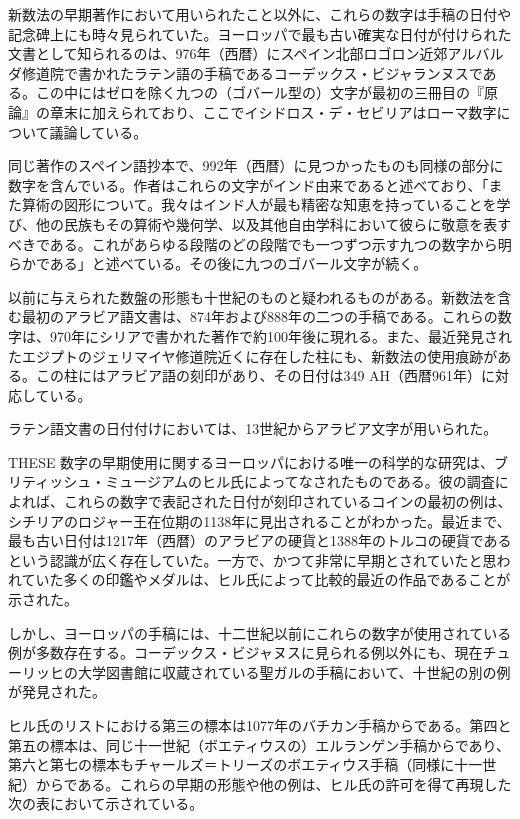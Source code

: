\documentclass[a4paper,11pt,openany]{ltjsbook}
\begin{document}
新数法の早期著作において用いられたこと以外に、これらの数字は手稿の日付や記念碑上にも時々見られていた。ヨーロッパで最も古い確実な日付が付けられた文書として知られるのは、976年（西暦）にスペイン北部ロゴロン近郊アルバルダ修道院で書かれたラテン語の手稿であるコーデックス・ビジャランヌスである。この中にはゼロを除く九つの（ゴバール型の）文字が最初の三冊目の『原論』の章末に加えられており、ここでイシドロス・デ・セビリアはローマ数字について議論している。

同じ著作のスペイン語抄本で、992年（西暦）に見つかったものも同様の部分に数字を含んでいる。作者はこれらの文字がインド由来であると述べており、「また算術の図形について。我々はインド人が最も精密な知恵を持っていることを学び、他の民族もその算術や幾何学、以及其他自由学科において彼らに敬意を表すべきである。これがあらゆる段階のどの段階でも一つずつ示す九つの数字から明らかである」と述べている。その後に九つのゴバール文字が続く。

以前に与えられた数盤の形態も十世紀のものと疑われるものがある。新数法を含む最初のアラビア語文書は、874年および888年の二つの手稿である。これらの数字は、970年にシリアで書かれた著作で約100年後に現れる。また、最近発見されたエジプトのジェリマイヤ修道院近くに存在した柱にも、新数法の使用痕跡がある。この柱にはアラビア語の刻印があり、その日付は349 AH（西暦961年）に対応している。

ラテン語文書の日付付けにおいては、13世紀からアラビア文字が用いられた。

THESE 数字の早期使用に関するヨーロッパにおける唯一の科学的な研究は、ブリティッシュ・ミュージアムのヒル氏によってなされたものである。彼の調査によれば、これらの数字で表記された日付が刻印されているコインの最初の例は、シチリアのロジャー王在位期の1138年に見出されることがわかった。最近まで、最も古い日付は1217年（西暦）のアラビアの硬貨と1388年のトルコの硬貨であるという認識が広く存在していた。一方で、かつて非常に早期とされていたと思われていた多くの印鑑やメダルは、ヒル氏によって比較的最近の作品であることが示された。

しかし、ヨーロッパの手稿には、十二世紀以前にこれらの数字が使用されている例が多数存在する。コーデックス・ビジャヌスに見られる例以外にも、現在チューリッヒの大学図書館に収蔵されている聖ガルの手稿において、十世紀の別の例が発見された。

ヒル氏のリストにおける第三の標本は1077年のバチカン手稿からである。第四と第五の標本は、同じ十一世紀（ボエティウスの）エルランゲン手稿からであり、第六と第七の標本もチャールズ＝トリーズのボエティウス手稿（同様に十一世紀）からである。これらの早期の形態や他の例は、ヒル氏の許可を得て再現した次の表において示されている。
\end{document}
